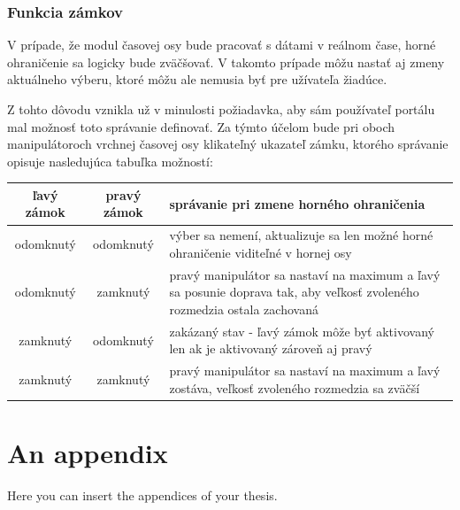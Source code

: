 \documentclass[
  digital, %
  twoside, %
  notable,   %
  nolof,   %
  nolot,   %
]{fithesis3}
\begin{document}
\subsection{Funkcia zámkov}
\label{sec:lockers}
V prípade, že modul časovej osy bude pracovať s dátami v reálnom čase, horné ohraničenie sa logicky bude zväčšovať. V takomto prípade môžu nastať aj zmeny aktuálneho výberu, ktoré môžu ale nemusia byť pre užívateľa žiadúce.

Z tohto dôvodu vznikla už v minulosti požiadavka, aby sám používateľ portálu mal možnosť toto správanie definovať. Za týmto účelom bude pri oboch manipulátoroch vrchnej časovej osy klikateľný ukazateľ zámku, ktorého správanie opisuje nasledujúca tabuľka možností:
\begin{center}
  \begin{tabular}{ | c | c || p{6.5cm} | }
    \hline
    ľavý zámok & pravý zámok & správanie pri zmene horného ohraničenia \\ \hline \hline
    odomknutý & odomknutý & výber sa nemení, aktualizuje sa len možné horné ohraničenie viditeľné v hornej osy \\ \hline
    odomknutý & zamknutý & pravý manipulátor sa nastaví na maximum a ľavý sa posunie doprava tak, aby veľkosť zvoleného rozmedzia ostala zachovaná\\ \hline
    zamknutý & odomknutý & zakázaný stav - ľavý zámok môže byť aktivovaný len ak je aktivovaný zároveň aj pravý \\ \hline
    zamknutý & zamknutý & pravý manipulátor sa nastaví na maximum a ľavý zostáva, veľkosť zvoleného rozmedzia sa zväčší \\ \hline
  \end{tabular}
\end{center}



\printbibliography[heading=bibintoc] %

  \makeatletter\thesis@blocks@clear\makeatother
  \printindex

\appendix %
\chapter{An appendix}
Here you can insert the appendices of your thesis.
\end{document}
